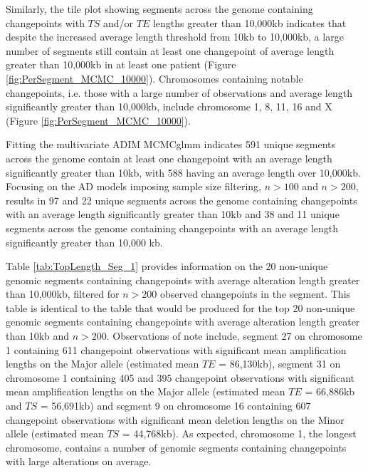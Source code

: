 Similarly,  the tile plot showing segments across the genome containing changepoints with $TS$ and/or $TE$ lengths greater than 10,000kb indicates that despite the increased average length threshold from 10kb to 10,000kb, a large number of segments still contain at least one changepoint of average length greater than 10,000kb in at least one patient (Figure \ref{fig:PerSegment_MCMC_10000}). Chromosomes containing notable changepoints, i.e. those with a large number of observations and average length significantly greater than 10,000kb, include chromosome 1, 8, 11, 16 and X (Figure \ref{fig:PerSegment_MCMC_10000}).

Fitting the multivariate ADIM MCMCglmm indicates 591 unique segments across the genome contain at least one changepoint with an average length significantly greater than 10kb, with 588 having an average length over 10,000kb. Focusing on the AD models imposing sample size filtering, $n > 100$ and $n > 200$, results in 97 and 22 unique segments across the genome containing changepoints with an average length significantly greater than 10kb and 38 and 11 unique segments across the genome containing changepoints with an average length significantly greater than 10,000 kb. 

Table \ref{tab:TopLength_Seg_1} provides information on the 20 non-unique genomic segments containing changepoints with average alteration length greater than 10,000kb, filtered for $n > 200$ observed changepoints in the segment. This table is identical to the table that would be produced for the top 20 non-unique genomic segments containing changepoints with average alteration length greater than 10kb and $n > 200$. Observations of note include, segment 27 on chromosome 1 containing 611 changepoint observations with significant mean amplification lengths on the Major allele (estimated mean $TE$ = 86,130kb), segment 31 on chromosome 1 containing 405 and 395 changepoint observations with significant mean amplification lengths on the Major allele (estimated mean $TE$ = 66,886kb and $TS$ = 56,691kb) and segment 9 on chromosome 16 containing 607 changepoint observations with significant mean deletion lengths on the Minor allele (estimated mean $TS$ = 44,768kb). As expected, chromosome 1, the longest chromosome, contains a number of genomic segments containing changepoints with large alterations on average. 

